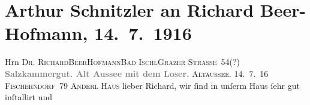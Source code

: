 

         
         \renewcommand{\erwaehntePersonen}{Personen: Richard Beer-Hofmann, Paula Beer-Hofmann, Gabriel Beer-Hofmann, Naëmah Beer-Hofmann, Mirjam Beer-Hofmann, Olga Schnitzler, Lili Schnitzler, Heinrich Schnitzler}
         \renewcommand{\erwaehnteOrte}{Orte: Altaussee, Bad Aussee, Bad Ischl, Fischerndorf, Grazer Straße, Loser, Salzkammergut, Seewirt, Villa Annerl}
         \renewcommand{\erwaehnteWerke}{}
               \section[Arthur Schnitzler an Richard Beer-Hofmann, 14. 7. 1916]{ Arthur Schnitzler an Richard Beer-Hofmann, 14. 7. 1916}\nopagebreak{}\rehead{ }\begin{ledgroupsized}[t]{13cm}\normalsize\beginnumbering \toendnotes[C]{\smallbreak\pagebreak[2]} 
\toendnotes[C]{\smallbreak}\pstart{}{\pb}Hrn \textsc{Dr. Richard}\pend{}\pstart{}\textsc{BeerHofmann}\pend{}\pstart{}\textsc{Bad Ischl}\pend{}\pstart{}\textsc{Grazer Straße 54(?)}\pend{}{\bigskip}\pstart
           \noindent{}\centering{}{\pb}\textcolor{gray}{\textbf{Salzkammergut. Alt Aussee mit dem Loser.}}\pend
           \pstart
           \raggedleft{}{\pb}\textsc{Altaussee}. 14. 7. 16\pend
           \pstart
           \raggedleft{}\textsc{Fischerndorf 79}\pend
           \pstart
           \noindent{}\raggedleft{}\textsc{Anderl Haus}\pend
           \pstart
           lieber Richard, wir ſind in unſerm Haus ſehr gut inſtallirt und

\end{ledgroupsized}
